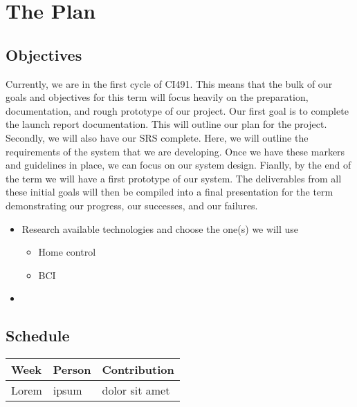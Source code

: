 \documentclass{report}
\begin{document}
\newpage
\section*{\centering The Plan}

\subsection*{Objectives}
Currently, we are in the first cycle of CI491. This means that the bulk of our goals and objectives for this term will focus heavily on the preparation, documentation, and rough prototype of our project. Our first goal is to complete the launch report documentation. This will outline our plan for the project. Secondly, we will also have our SRS complete. Here, we will outline the requirements of the system that we are developing. Once we have these markers and guidelines in place, we can focus on our system design. Fianlly, by the end of the term we will have a first prototype of our system. The deliverables from all these initial goals will then be compiled into a final presentation for the term demonstrating our progress, our successes, and our failures. 

\begin{itemize}
    \item Research available technologies and choose the one(s) we will use
        \begin{itemize}
            \item Home control
            \item BCI
        \end{itemize}
    \item %
\end{itemize}

\subsection*{Schedule}

\begin{tabular}{| l | l | l |}
    \hline
    Week & Person & Contribution \\
    \hline \hline
    Lorem & ipsum & dolor sit amet \\ \hline
\end{tabular}
\end{document}
